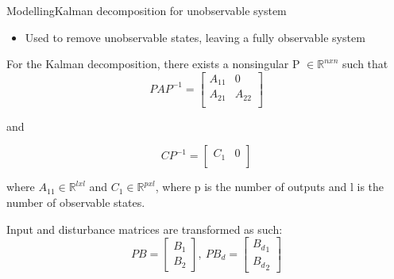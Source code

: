 \begin{frame}{Modelling}{Kalman decomposition for unobservable system}
	\begin{itemize}
		\item Used to remove unobservable states, leaving a fully observable system
	\end{itemize}
	For the Kalman decomposition, there exists a nonsingular P  $\in \mathbb{R} ^{n x n}$ such that
	\begin{equation}
		PAP^{-1} = \begin{bmatrix}
			A_{11}       & 0 \\
			A_{21}       & A_{22} \\
		\end{bmatrix}
	\end{equation}
	
	and
	
	\begin{equation}
		CP^{-1} = \begin{bmatrix}
			C_{1}       & 0 \\
		\end{bmatrix}
	\end{equation}
	
	where $A_{11} \in \mathbb{R} ^{l x l}$ and $C_{1} \in \mathbb{R} ^{p x l}$, where p is the number of outputs and l is the number of observable states.
	
	Input and disturbance matrices are transformed as such:
	\begin{equation}
		PB = \begin{bmatrix}
			B_1 \\
			B_2
		\end{bmatrix}, \
		PB_d = \begin{bmatrix}
			{B_d}_1 \\
			{B_d}_2
		\end{bmatrix}
	\end{equation}
\end{frame}




